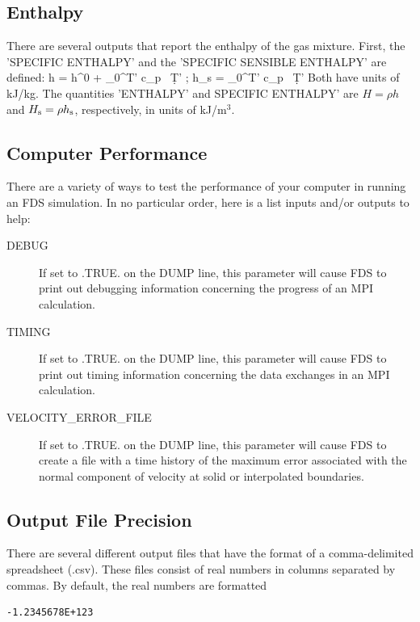 \documentclass[11pt]{book}
\begin{document}
\subsection{Enthalpy}
\label{info:enthalpy}

There are several outputs that report the enthalpy of the gas mixture. First, the {\ct 'SPECIFIC ENTHALPY'} and the {\ct 'SPECIFIC SENSIBLE ENTHALPY'} are defined:
\be
   h = h^0 + \int_0^{T'} c_p \, \d T'  \quad ; \quad h_{\rm s} = \int_0^{T'} c_p \, \d T'
\ee
Both have units of kJ/kg. The quantities {\ct 'ENTHALPY'} and {\ct SPECIFIC ENTHALPY'} are $H=\rho h$ and $H_{\rm s}=\rho h_{\rm s}$, respectively, in units of kJ/m$^3$.


\subsection{Computer Performance}
\label{info:TIMING}

There are a variety of ways to test the performance of your computer in running an FDS simulation. In no particular order, here is a list inputs and/or outputs to help:
\begin{description}
\item[{\ct DEBUG}]  If set to {\ct .TRUE.} on the {\ct DUMP} line, this parameter will cause FDS to print out debugging information concerning the progress of an MPI
calculation.
\item[{\ct TIMING}] If set to {\ct .TRUE.} on the {\ct DUMP} line, this parameter will cause FDS to print out timing information concerning the data exchanges in an MPI
calculation.
\item[{\ct VELOCITY\_ERROR\_FILE}] If set to {\ct .TRUE.} on the {\ct DUMP} line, this parameter will cause FDS to create a file with a time history of the maximum error
associated with the normal component of velocity at solid or interpolated boundaries.
\end{description}


\subsection{Output File Precision}
\label{info:SIG_FIGS}

There are several different output files that have the format of a comma-delimited spreadsheet (.csv). These files consist of real numbers in columns separated by
commas. By default, the real numbers are formatted

\begin{lstlisting}
-1.2345678E+123
\end{lstlisting}
\end{document}
